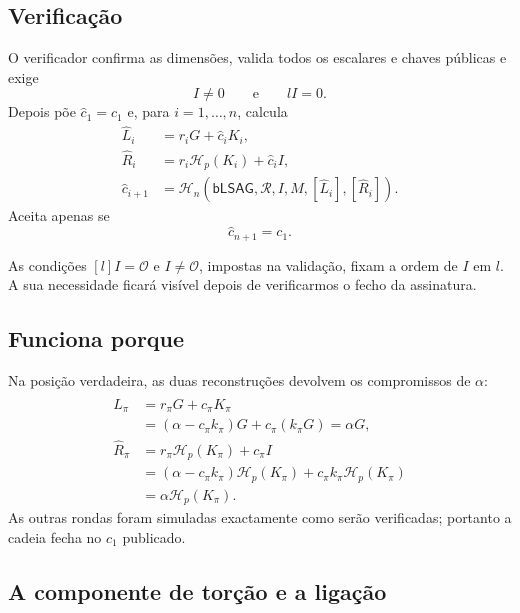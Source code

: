 \subsection*{Verificação}

O verificador confirma as dimensões, valida todos os escalares e chaves
públicas e exige
\[
I\neq0\qquad\text{e}\qquad lI=0.
\]
Depois põe \(\widehat c_1=c_1\) e, para \(i=1,\ldots,n\), calcula
\begin{align*}
\widehat L_i&=r_iG+\widehat c_iK_i,\\
\widehat R_i&=r_i\mathcal H_p(K_i)+\widehat c_iI,\\
\widehat c_{i+1}
  &=\mathcal H_n(\mathsf{bLSAG},\mathcal R,I,M,
                 [\widehat L_i],[\widehat R_i]).
\end{align*}
Aceita apenas se
\[
\widehat c_{n+1}=c_1.
\]

%
As condições \([l]I=\mathcal O\) e \(I\ne\mathcal O\), impostas na
validação, fixam a ordem de \(I\) em \(l\). A sua necessidade ficará
visível depois de verificarmos o fecho da assinatura.

\subsection*{Funciona porque}

Na posição verdadeira, as duas reconstruções devolvem os compromissos de
\(\alpha\):
\begin{align*}
\widehat L_\pi
  &=r_\pi G+c_\pi K_\pi\\
  &=(\alpha-c_\pi k_\pi)G+c_\pi(k_\pi G)
   =\alpha G,\\
\widehat R_\pi
  &=r_\pi\mathcal H_p(K_\pi)+c_\pi I\\
  &=(\alpha-c_\pi k_\pi)\mathcal H_p(K_\pi)
    +c_\pi k_\pi\mathcal H_p(K_\pi)\\
  &=\alpha\mathcal H_p(K_\pi).
\end{align*}
As outras rondas foram simuladas exactamente como serão verificadas; portanto
a cadeia fecha no \(c_1\) publicado.

\subsection*{A componente de torção e a ligação}
\label{subsec:key-image-torsion}

